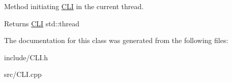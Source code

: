 Method initiating \hyperlink{classsimpleP2P_1_1CLI}{C\+LI} in the current thread. 

\begin{DoxyReturn}{Returns}
\hyperlink{classsimpleP2P_1_1CLI}{C\+LI} std\+::thread 
\end{DoxyReturn}


The documentation for this class was generated from the following files\+:\begin{DoxyCompactItemize}
\item 
include/C\+L\+I.\+h\item 
src/C\+L\+I.\+cpp\end{DoxyCompactItemize}
